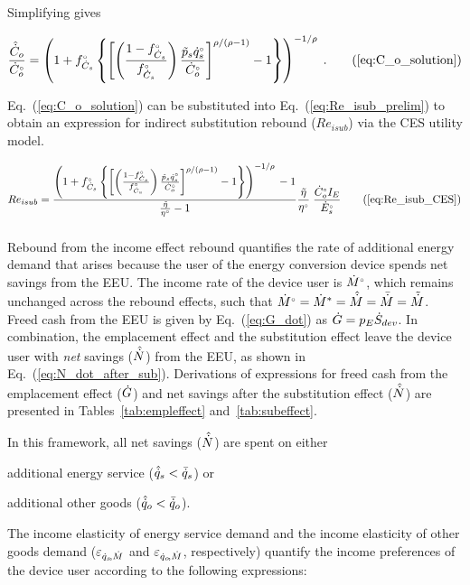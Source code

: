Simplifying gives

\begin{equation}
  \frac{\rasub{C}_o}{\rbempl{C}_o} = \Cosolution{} \; . \tag{\ref{eq:C_o_solution}}
\end{equation}

Eq.~(\ref{eq:C_o_solution}) can be substituted into Eq.~(\ref{eq:Re_isub_prelim})
to obtain an expression for indirect substitution rebound ($Re_{isub}$)
via the CES utility model.

\begin{equation}
  Re_{isub} = \ReisubCES{} \tag{\ref{eq:Re_isub_CES}}
\end{equation}


\subsubsection{\Inceffect{}} 
\label{sec:Re_inc}

Rebound from the income effect rebound quantifies the rate of additional energy demand 
that arises because the user of the energy conversion device spends net
savings from the EEU.
The income rate of the device user is ${}{\dot{M}}^{\scriptscriptstyle \circ}$, 
which remains unchanged across the rebound effects, 
such that
${}{\dot{M}}^{\scriptscriptstyle \circ} = {\dot{M}}^* = \hat{\dot{M}} = \bar{\dot{M}} = \tilde{\dot{M}}$.
Freed cash from the EEU is given by Eq.~(\ref{eq:G_dot})
as $\dot{G} = p_E \dot{S}_{dev}$. 
In combination, the emplacement effect and
the substitution effect leave the device user with
\emph{net} savings ($\hat{\dot{N}}$) from the EEU,
as shown in Eq.~(\ref{eq:N_dot_after_sub}).
Derivations of expressions for 
freed cash from the emplacement effect ($\dot{G}$) and
net savings after the substitution effect ($\hat{\dot{N}}$)
are presented in Tables~\ref{tab:empleffect} and~\ref{tab:subeffect}.

In this framework, all net savings ($\hat{\dot{N}}$) are spent on either 
%
\begin{enumerate*}[label={(\roman*)}]
	
  \item additional energy service 
        ($\hat{\dot{q}}_s < \bar{\dot{q}}_s$) or
  
  \item additional other goods
        ($\hat{\dot{q}}_o < \bar{\dot{q}}_o$).
    
\end{enumerate*}
%
The income elasticity of energy service demand and 
the income elasticity of other goods demand 
($\varepsilon_{\dot{q}_s\!,\dot{M}}$ and $\varepsilon_{\dot{q}_o\!,\dot{M}}$, respectively)
quantify the income preferences of the device user according to the following expressions:

